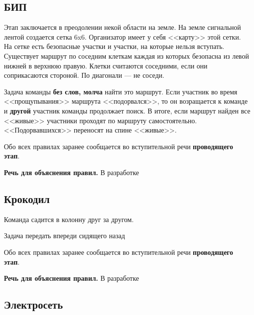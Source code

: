 \documentclass[a4paper, 14pt]{extarticle}
\theoremstyle{definition}
\begin{document}
{}
\subsection*{БИП}

\par Этап заключается в преодолении некой области на земле. На земле сигнальной лентой создается сетка 6x6. Организатор имеет у себя <<карту>> этой сетки. На сетке есть безопасные участки и участки, на которые нельзя вступать. Существует маршрут по соседним клеткам каждая из которых безопасна из левой нижней в верхнюю правую. Клетки считаются соседними, если они соприкасаются стороной. По диагонали --- не соседи.

\par Задача команды \textbf{без слов, молча} найти это маршрут. Если участник во время <<прощупывания>> маршрута <<подорвался>>, то он возращается к команде и \textbf{другой} участник команды продолжает поиск. В итоге, если маршрут найден все <<живые>> участники проходят по маршруту самостоятельно. <<Подорвавшихся>> переносят на спине <<живые>>.

\par Обо всех правилах заранее сообщается во вступительной речи \textbf{проводящего этап}.

\par \textbf{Речь для объяснения правил.} В разработке

{}
\subsection*{Крокодил}

\par Команда садится в колонну друг за другом.

\par Задача передать впереди сидящего назад

\par Обо всех правилах заранее сообщается во вступительной речи \textbf{проводящего этап}.

\par \textbf{Речь для объяснения правил.} В разработке

{}
\subsection*{Электросеть}
\end{document}
